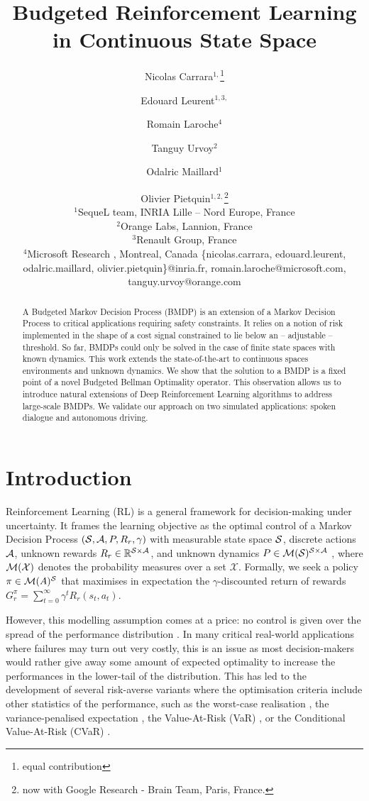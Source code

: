 \documentclass{article}
\title{Budgeted Reinforcement Learning in Continuous State Space}
\author{
Nicolas Carrara$^{1,}$\thanks{equal contribution}\and
Edouard Leurent$^{1,3,}$\footnotemark[1]\and
Romain Laroche$^{4}$\and
Tanguy Urvoy$^{2}$\and
Odalric Maillard$^{1}$\and
Olivier Pietquin$^{1,2,}$\thanks{now with Google Research - Brain Team, Paris, France.}\\
\affiliations $^1$SequeL team, INRIA Lille -- Nord Europe, France\\
$^2$Orange Labs, Lannion, France\\
$^3$Renault Group, France\\
$^4$Microsoft Research , Montreal, Canada
\emails
\{nicolas.carrara, edouard.leurent, odalric.maillard, olivier.pietquin\}@inria.fr,
romain.laroche@microsoft.com, tanguy.urvoy@orange.com
}
\begin{document}
\maketitle
\begin{abstract}
    A Budgeted Markov Decision Process (BMDP) is an extension of a Markov Decision Process to critical applications requiring safety constraints. It relies on a notion of risk implemented in the shape of a cost signal constrained  to lie below an -- adjustable -- threshold.
    So far, BMDPs could only be solved in the case of finite state spaces with known dynamics. This work extends the state-of-the-art to continuous spaces environments and unknown dynamics. We show that the solution to a BMDP is a fixed point of a novel Budgeted Bellman Optimality operator. This observation allows us to introduce natural extensions of Deep Reinforcement Learning algorithms to address large-scale BMDPs. We validate our approach on two simulated applications: spoken dialogue and autonomous driving.
\end{abstract}

\section{Introduction}
\label{sec:intro}

Reinforcement Learning (RL) is a general framework for decision-making under uncertainty. It frames the learning objective as the optimal control of a Markov Decision Process  $(\mathcal{S}, \mathcal{A}, P, R_r, \gamma)$ with measurable state space $\mathcal{S}$, discrete actions $\mathcal{A}$, unknown rewards $R_r\in\mathbb{R}^{\mathcal{S} \times \mathcal{A}}$, and unknown dynamics $P\in \mathcal{M}(\mathcal{S})^{\mathcal{S} \times \mathcal{A}}$ , where $\mathcal{M}(\mathcal{X})$ denotes the probability measures over a set $\mathcal{X}$. Formally, we seek a policy $\pi\in\mathcal{M}(A)^{\mathcal{S}}$ that maximises in expectation the $\gamma$-discounted return of rewards $G_r^\pi = \sum_{t=0}^\infty \gamma^t R_r(s_t, a_t)$.

However, this modelling assumption comes at a price: no control is given over the spread of the performance distribution \citep{Dann2018}. In many critical real-world applications where failures may turn out very costly, this is an issue as most decision-makers would rather give away some amount of expected optimality to increase the performances in the lower-tail of the distribution. This has led to the development of several risk-averse variants where the optimisation criteria include other statistics of the performance, such as the worst-case realisation \citep{Iyengar2005,Nilim2005,Wiesemann2013}, the variance-penalised expectation \citep{Garcia2015,Tamar2012}, the Value-At-Risk (VaR) \citep{Mausser2003,Luenberger2013}, or the Conditional Value-At-Risk (CVaR) \citep{Chow2014,ChowGJP15}.
\end{document}

